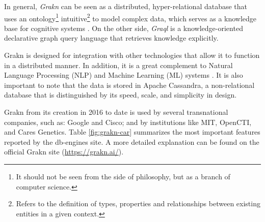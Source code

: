 In general, \textit{Grakn} can be seen as a distributed, hyper-relational 
database that uses an ontology\footnote{It should not be seen from the side 
of philosophy, but as a branch of computer science.} intuitive\footnote{Refers 
to the definition of types, properties and relationships between existing 
entities in a given context.} to model complex data, which serves as a 
knowledge base for cognitive systems \cite{dbengines}. On the other side, 
\textit{Graql} is a knowledge-oriented declarative graph query language that 
retrieves knowledge explicitly.

Grakn is designed for integration with other technologies that allow it to 
function in a distributed manner. In addition, it is a great complement to 
Natural Language Processing (NLP) and Machine Learning (ML) systems 
\cite{grakn-youtube}. It is also important to note that the data is stored in 
Apache Cassandra, a non-relational database that is distinguished by its speed, 
scale, and simplicity in design.

Grakn from its creation in 2016 to date is used by several transnational 
companies, such as: Google and Cisco; and by institutions like MIT, OpenCTI, 
and Cares Genetics. Table \ref{fig:grakn-car} summarizes the most important 
features reported by the db-engines \cite{dbengines} site. A more detailed 
explanation can be found on the official Grakn site (\url{https://grakn.ai/}).

